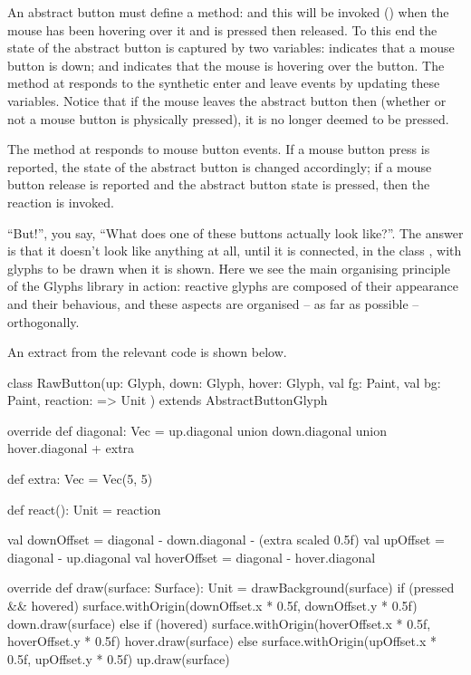 An abstract button must define a  method: and this
will be invoked () when the mouse has been hovering over it and
is pressed then released. To this end the state of the abstract button is
captured by two variables:  indicates that a mouse button
is down; and  indicates that the mouse is hovering over the
button. The method  at  responds to
the synthetic enter and leave events by updating these variables. Notice
that if the mouse leaves the abstract button then (whether or not a mouse button is
physically pressed), it is no longer deemed to be pressed.

The method  at  responds to
mouse button events. If a mouse button press is reported, the state of the abstract button is
changed accordingly; if a mouse button release is reported and the abstract button state is pressed, then
the reaction is invoked.

``But!'', you say, ``What does one of these buttons actually look like?''.
The answer is that it doesn't look like anything at all, until it is connected, in
the class , with glyphs to be drawn when it is shown. 
Here we see the main organising principle of the Glyphs library in action: reactive
glyphs are composed of their appearance and their behavious, and these aspects
are organised -- as far as possible -- orthogonally.

An extract from the relevant code is shown below.

\begin{scala}

  class RawButton(up: Glyph, down: Glyph, hover: Glyph, 
                  val fg: Paint,
                  val bg: Paint,
                  reaction: => Unit
                 ) extends AbstractButtonGlyph {
     override
     def diagonal: Vec =
         up.diagonal union down.diagonal union hover.diagonal + extra

     def extra:      Vec = Vec(5, 5)
    
     def react(): Unit = { reaction }

     val downOffset  = diagonal - down.diagonal - (extra scaled 0.5f)
     val upOffset    = diagonal - up.diagonal
     val hoverOffset = diagonal - hover.diagonal

     override
     def draw(surface: Surface): Unit = {
      drawBackground(surface)
      if (pressed && hovered)
          surface.withOrigin(downOffset.x * 0.5f, downOffset.y * 0.5f) {
              down.draw(surface)
        }
      else if (hovered)
          surface.withOrigin(hoverOffset.x * 0.5f, hoverOffset.y * 0.5f) {
             hover.draw(surface)
          }
      else
          surface.withOrigin(upOffset.x * 0.5f, upOffset.y * 0.5f) {
             up.draw(surface)
          }
    }
}                  
\end{scala}

